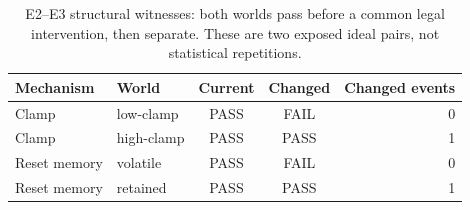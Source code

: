 \begin{table}[htbp]
\centering\small
\caption{E2--E3 structural witnesses: both worlds pass before a common legal intervention, then separate. These are two exposed ideal pairs, not statistical repetitions.}
\label{tab:witnesses}
\begin{tabular}{@{}llccr@{}}\toprule
Mechanism & World & Current & Changed & Changed events \\\midrule
Clamp & low-clamp & PASS & FAIL & 0 \\
Clamp & high-clamp & PASS & PASS & 1 \\
Reset memory & volatile & PASS & FAIL & 0 \\
Reset memory & retained & PASS & PASS & 1 \\
\bottomrule\end{tabular}
\end{table}
